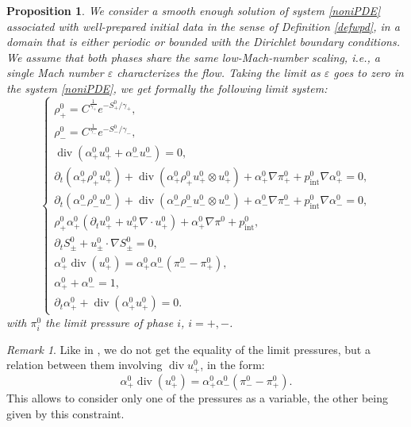 \documentclass[11pt, twoside, a4paper]{article}
\theoremstyle{plain}
\newtheorem{proposition}[theorem]{Proposition}
\theoremstyle{remark}
\newtheorem{remark}[theorem]{Remark}
\numberwithin{equation}{section}
\renewcommand{\div}{\operatorname{div}}
\renewcommand{\epsilon}{\varepsilon}
\newcommand{\dt}{\partial_t}
\newcommand{\eps}{\varepsilon}
\newcommand{\ap}{\alpha_+}
\newcommand{\am}{\alpha_-}
\newcommand{\rp}{\rho_+}
\newcommand{\rmi}{\rho_-}
\newcommand{\gp}{\gamma_{+}}
\newcommand{\gm}{\gamma_-}
\begin{document}
\begin{proposition}
We consider a smooth enough solution of system \eqref{noniPDE} associated with well-prepared initial data in the sense of Definition \eqref{defwpd}, in a domain that is either periodic or bounded with the Dirichlet boundary conditions. We assume that both phases share the same low-Mach-number scaling, i.e., a single Mach number $\epsilon$ characterizes the flow. Taking the limit as $\eps$ goes to zero in the system \eqref{noniPDE}, we get formally the following limit system:
\begin{equation*}
    \begin{cases}
        \rp^0 = C^{\frac{1}{\gp}}e^{-S_+^0/\gp},\\
        \rmi^0 = C^{\frac{1}{\gm}}e^{-S_-^0/\gm},\\
        \div (\ap^0 u_+^0 +\am^0 u_-^0) = 0,\\
        \dt (\ap^0 \rp^0 u_+^0) + \div (\ap^0 \rp^0 u_+^0 \otimes u_+^0) + \ap^0 \nabla \pi_+^0 + p_{\mathrm{int}}^0 \nabla \ap^0 = 0,\\
        \dt (\am^0 \rmi^0 u_-^0) + \div (\am^0 \rmi^0 u_-^0 \otimes u_-^0) + \am^0 \nabla \pi_-^0 + p_{\mathrm{int}}^0 \nabla \am^0 = 0,\\
        \rp^0 \ap^0 ( \dt u_+^0 + u_+^0 \nabla \cdot u_+^0) + \ap^0 \nabla \pi^0 + p_{\mathrm{int}}^0,\\
        \dt S_\pm^0 + u_\pm^0 \cdot \nabla S_\pm^0=0,\\
        \ap^0 \div(u_+^0) = \ap^0 \am^0 (\pi_-^0 - \pi_+^0 ),\\
        \ap^0 + \am^0 = 1,\\
        \dt \alpha_+^0 + \div (\alpha_+^0 u_+^0) = 0.
    \end{cases}
\end{equation*}
with $\pi_i^0$ the limit pressure of phase $i$, $i=+,-$.
\end{proposition}

\begin{remark}
    Like in \cite{narbona2024two}, we do not get the equality of the limit pressures, but a relation between them involving $\div u_+^0$, in the form: 
    $$\ap^0 \div(u_+^0) = \ap^0 \am^0 (\pi_-^0 - \pi_+^0 ).$$
    This allows to consider only one of the pressures as a variable, the other being given by this constraint.
\end{remark}
\end{document}
